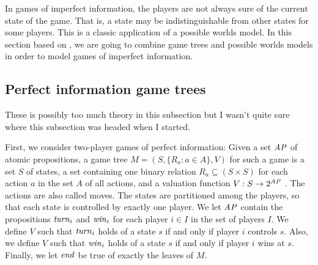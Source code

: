 In games of imperfect information, the players are not always sure of the current state of the game. That is, a state may be indistinguishable from other states for some players. This is a classic application of a possible worlds model. In this section based on \cite{benthem2001a}, we are going to combine game trees and possible worlds models in order to model games of imperfect information.


\subsection{Perfect information game trees} \label{seq:perfect-information}

{ \color{red} These is possibly too much theory in this subsection but I wasn't quite sure where this subsection was headed when I started. }

First, we consider two-player games of perfect information: Given a set $ \mathit{AP} $ of atomic propositions, a game tree $ M = (S, \{ R_{a} : a \in A \}, V) $ for such a game is a set $ S $ of states, a set containing one binary relation $ R_{a} \subseteq (S \times S) $ for each action $ a $ in the set $ A $ of all actions, and a valuation function $ V : S \rightarrow 2^{\mathit{AP}} $ \cite{benthem2001a}. The actions are also called moves. The states are partitioned among the players, so that each state is controlled by exactly one player. We let $ \mathit{AP} $ contain the propositions $ \mathit{turn}_{i} $ and $ \mathit{win}_{i} $ for each player $ i \in I $ in the set of players $ I $. We define $ V $ such that $ \mathit{turn}_{i} $ holds of a state $ s $ if and only if player $ i $ controls $ s $. Also, we define $ V $ such that $ \mathit{win}_{i} $ holds of a state $ s $ if and only if player $ i $ wins at $ s $. Finally, we let $ \mathit{end} $ be true of exactly the leaves of $ M $.

